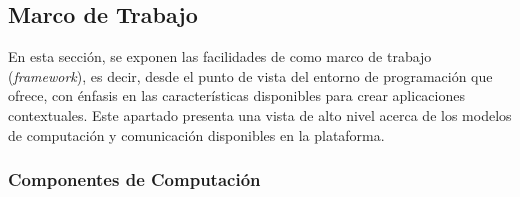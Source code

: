 \subsection{Marco de Trabajo}

\label{ssec52:framework}En esta sección, se exponen las facilidades
de \emph{} como marco de trabajo (\emph{framework}),
es decir, desde el punto de vista del entorno de programación que
ofrece, con énfasis en las características disponibles para crear
aplicaciones contextuales. Este apartado presenta una vista de alto
nivel acerca de los modelos de computación y comunicación disponibles
en la plataforma.

\subsubsection{Componentes de Computación}

